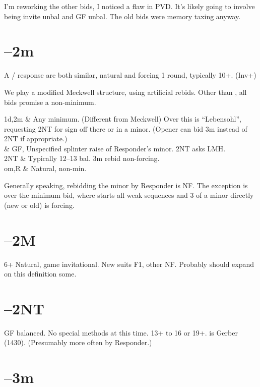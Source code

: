 \documentclass[main]{subfiles}
\begin{document}
\begin{info}
	I'm reworking the other bids, I noticed a flaw in PVD.  It's likely going to involve  being invite unbal and  GF unbal. The old bids were memory taxing anyway.
\end{info}


\section[1D--2m]{--2m}

A / response are both similar, natural and forcing 1 round, typically 10+. (Inv+)

We play a modified Meckwell structure, using artificial rebids. Other than , all bids promise a non-minimum.

\begin{bidtable}{1d,2m}
	 & Any minimum. (Different from Meckwell) Over this  is ``Lebensohl'', requesting 2NT for sign off there or in a minor. (Opener can bid 3m instead of 2NT if appropriate.) \\
	 & GF, Unspecified splinter raise of Responder's minor. 2NT asks LMH. \\
	2NT & Typically 12--13 bal. 3m rebid non-forcing. \\
	om,R &  Natural, non-min. \\
\end{bidtable}

Generally speaking, rebidding the minor by Responder is NF. The exception is over the  minimum bid, where  starts all weak sequences and 3 of a minor directly (new or old) is forcing.

\section[1D--2M]{--2M}

6+ Natural, game invitational.  New suits F1, other NF.  Probably should expand on this definition some.

\section[1D--2NT]{--2NT}

GF balanced. No special methods at this time. 13+ to 16 or 19+.   is Gerber (1430).  (Presumably more often by Responder.)

\section[1D--3m]{--3m}
\end{document}
